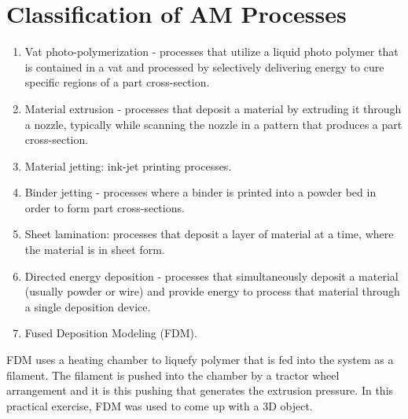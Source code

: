\section{Classification of AM Processes}
\begin{enumerate}
\item Vat photo-polymerization - processes that utilize a liquid photo polymer that is
contained in a vat and processed by selectively delivering energy to cure specific
regions of a part cross-section.
\item Material extrusion - processes that deposit a material by extruding it through a
nozzle, typically while scanning the nozzle in a pattern that produces a part
cross-section.
\item Material jetting: ink-jet printing processes.
\item Binder jetting - processes where a binder is printed into a powder bed in order to
form part cross-sections.
\item Sheet lamination: processes that deposit a layer of material at a time, where the
material is in sheet form.
\item Directed energy deposition - processes that simultaneously deposit a material
(usually powder or wire) and provide energy to process that material through a
single deposition device.
\item Fused Deposition Modeling (FDM).
\end{enumerate}
FDM uses a
heating chamber to liquefy polymer that is fed into the system as a filament. The filament is pushed into the chamber by a tractor wheel arrangement and it is this
pushing that generates the extrusion pressure\cite{classnotes}. In this practical exercise, FDM was used to come up with a 3D object.
